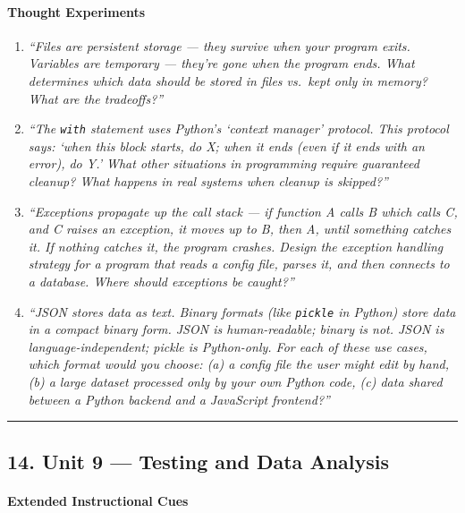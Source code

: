 \documentclass[
  justified,
  openright,
]{tufte-book}
\let\subsubsection\paragraph
\let\paragraph\paragraph
\let\subsubsection\paragraph
\let\paragraph\paragraph
\begin{document}
\paragraph{Thought Experiments}\label{thought-experiments-15}

\begin{enumerate}
\def\labelenumi{\arabic{enumi}.}
\item
  \emph{``Files are persistent storage --- they survive when your
  program exits. Variables are temporary --- they're gone when the
  program ends. What determines which data should be stored in files
  vs.~kept only in memory? What are the tradeoffs?''}
\item
  \emph{``The \texttt{with} statement uses Python's `context manager'
  protocol. This protocol says: `when this block starts, do X; when it
  ends (even if it ends with an error), do Y.' What other situations in
  programming require guaranteed cleanup? What happens in real systems
  when cleanup is skipped?''}
\item
  \emph{``Exceptions propagate up the call stack --- if function A calls
  B which calls C, and C raises an exception, it moves up to B, then A,
  until something catches it. If nothing catches it, the program
  crashes. Design the exception handling strategy for a program that
  reads a config file, parses it, and then connects to a database. Where
  should exceptions be caught?''}
\item
  \emph{``JSON stores data as text. Binary formats (like \texttt{pickle}
  in Python) store data in a compact binary form. JSON is
  human-readable; binary is not. JSON is language-independent; pickle is
  Python-only. For each of these use cases, which format would you
  choose: (a) a config file the user might edit by hand, (b) a large
  dataset processed only by your own Python code, (c) data shared
  between a Python backend and a JavaScript frontend?''}
\end{enumerate}

\begin{center}\rule{0.5\linewidth}{0.5pt}\end{center}

\subsection{14. Unit 9 --- Testing and Data
Analysis}\label{unit-9-testing-and-data-analysis}

\subsubsection{Extended Instructional
Cues}\label{extended-instructional-cues-2}
\end{document}

